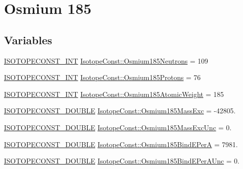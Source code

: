 \hypertarget{group___isotope_const-_osmium-_os185}{}\section{Osmium 185}
\label{group___isotope_const-_osmium-_os185}
\subsection*{Variables}
\begin{DoxyCompactItemize}
\item 
\mbox{\hyperlink{group___isotope_const-_macros_ga5f18360b3e99483a35c32d789e62621c}{I\+S\+O\+T\+O\+P\+E\+C\+O\+N\+S\+T\+\_\+\+I\+NT}} \mbox{\hyperlink{group___isotope_const-_osmium-_os185_ga92443289b652a344d4759f5a4003c30f}{Isotope\+Const\+::\+Osmium185\+Neutrons}} = 109
\item 
\mbox{\hyperlink{group___isotope_const-_macros_ga5f18360b3e99483a35c32d789e62621c}{I\+S\+O\+T\+O\+P\+E\+C\+O\+N\+S\+T\+\_\+\+I\+NT}} \mbox{\hyperlink{group___isotope_const-_osmium-_os185_ga253d728554adabde85d0602df9c13be4}{Isotope\+Const\+::\+Osmium185\+Protons}} = 76
\item 
\mbox{\hyperlink{group___isotope_const-_macros_ga5f18360b3e99483a35c32d789e62621c}{I\+S\+O\+T\+O\+P\+E\+C\+O\+N\+S\+T\+\_\+\+I\+NT}} \mbox{\hyperlink{group___isotope_const-_osmium-_os185_gaa31f8c332a8f94d2d04741ec7ce020df}{Isotope\+Const\+::\+Osmium185\+Atomic\+Weight}} = 185
\item 
\mbox{\hyperlink{group___isotope_const-_macros_ga8f45a7272ce02c0b4c65c44636ed719a}{I\+S\+O\+T\+O\+P\+E\+C\+O\+N\+S\+T\+\_\+\+D\+O\+U\+B\+LE}} \mbox{\hyperlink{group___isotope_const-_osmium-_os185_ga5efefbb9a0abbb4d38bd90703bee7a6f}{Isotope\+Const\+::\+Osmium185\+Mass\+Exc}} = -\/42805.
\item 
\mbox{\hyperlink{group___isotope_const-_macros_ga8f45a7272ce02c0b4c65c44636ed719a}{I\+S\+O\+T\+O\+P\+E\+C\+O\+N\+S\+T\+\_\+\+D\+O\+U\+B\+LE}} \mbox{\hyperlink{group___isotope_const-_osmium-_os185_ga3ee3e0e8220e9ed0fe242b09e0298a56}{Isotope\+Const\+::\+Osmium185\+Mass\+Exc\+Unc}} = 0.
\item 
\mbox{\hyperlink{group___isotope_const-_macros_ga8f45a7272ce02c0b4c65c44636ed719a}{I\+S\+O\+T\+O\+P\+E\+C\+O\+N\+S\+T\+\_\+\+D\+O\+U\+B\+LE}} \mbox{\hyperlink{group___isotope_const-_osmium-_os185_gadb80beb6d2ad02888fededb462b0f8d2}{Isotope\+Const\+::\+Osmium185\+Bind\+E\+PerA}} = 7981.
\item 
\mbox{\hyperlink{group___isotope_const-_macros_ga8f45a7272ce02c0b4c65c44636ed719a}{I\+S\+O\+T\+O\+P\+E\+C\+O\+N\+S\+T\+\_\+\+D\+O\+U\+B\+LE}} \mbox{\hyperlink{group___isotope_const-_osmium-_os185_gaa9530cadefd69c906741bf3fb1c317c1}{Isotope\+Const\+::\+Osmium185\+Bind\+E\+Per\+A\+Unc}} = 0.

\end{DoxyCompactItemize}

